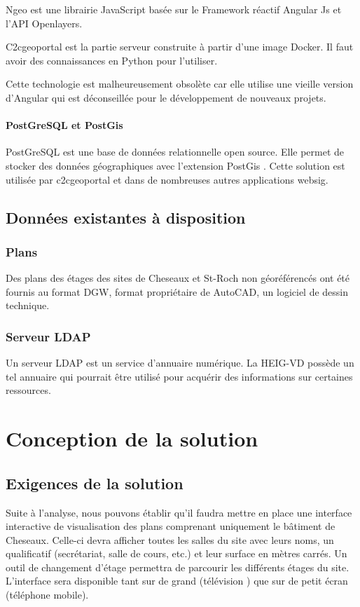 \documentclass[
    iai, %
    il, %
]{heig-tb}
\begin{document}
Ngeo est une librairie JavaScript basée sur le Framework réactif Angular Js et l'API Openlayers.

C2cgeoportal est la partie serveur construite à partir d'une image Docker. Il faut avoir des connaissances en Python pour l'utiliser.

Cette technologie est malheureusement obsolète car elle utilise une vieille version d'Angular qui est déconseillée pour le développement de nouveaux projets.

\subsubsection{PostGreSQL et PostGis}
PostGreSQL est une base de données relationnelle open source. Elle permet de stocker des données géographiques avec l'extension PostGis  \cite{postgis}.
Cette solution est utilisée par c2cgeoportal et dans de nombreuses autres applications \gls{websig}.

\section{Données existantes à disposition}
\subsection{Plans}
Des plans des étages des sites de Cheseaux et St-Roch non géoréférencés ont été fournis au format DGW, format propriétaire de AutoCAD, un logiciel de dessin technique.

\subsection{Serveur LDAP}
Un serveur LDAP est un service d'annuaire numérique.
La HEIG-VD possède un tel annuaire qui pourrait être utilisé pour acquérir des informations sur certaines ressources.

\chapter{Conception de la solution}

\section{Exigences de la solution}
Suite à l'analyse, nous pouvons établir qu'il faudra mettre en place une interface interactive de visualisation des plans comprenant uniquement le bâtiment de Cheseaux.
Celle-ci devra afficher toutes les salles du site avec leurs noms, un qualificatif (secrétariat, salle de cours, etc.) et leur surface en mètres carrés.
Un outil de changement d'étage permettra de parcourir les différents étages du site.
L'interface sera disponible tant sur de grand (télévision ) que sur de petit écran (téléphone mobile).
\end{document}
